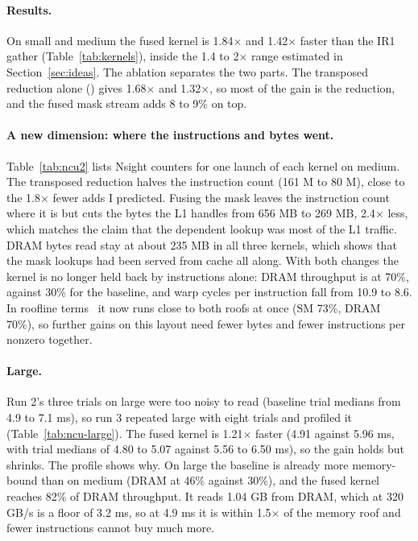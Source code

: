 \paragraph{Results.} On small and medium the fused kernel is 1.84$\times$ and 1.42$\times$ faster than
the IR1 gather (Table~\ref{tab:kernels}), inside the 1.4 to 2$\times$ range estimated in
Section~\ref{sec:ideas}. The ablation separates the two parts. The transposed reduction alone
() gives 1.68$\times$ and 1.32$\times$, so most of the gain is the reduction, and the
fused mask stream adds 8 to 9\% on top.

\paragraph{A new dimension: where the instructions and bytes went.} Table~\ref{tab:ncu2} lists Nsight
counters for one launch of each kernel on medium. The transposed reduction halves the instruction count
(161 M to 80 M), close to the 1.8$\times$ fewer adds I predicted. Fusing the mask leaves the instruction
count where it is but cuts the bytes the L1 handles from 656 MB to 269 MB, 2.4$\times$ less, which
matches the claim that the dependent lookup was most of the L1 traffic. DRAM bytes read stay at about
235 MB in all three kernels, which shows that the mask lookups had been served from cache all along.
With both changes the kernel is no longer held back by instructions alone: DRAM throughput is at 70\%, against 30\%
for the baseline, and warp cycles per instruction fall from 10.9 to 8.6. In roofline terms~\cite{williams2009} it now runs close to both roofs at once (SM 73\%, DRAM 70\%),
so further gains on this layout need fewer bytes and fewer instructions per nonzero together.

\paragraph{Large.} Run 2's three trials on large were too noisy to read (baseline trial medians from 4.9
to 7.1 ms), so run 3 repeated large with eight trials and profiled it (Table~\ref{tab:ncu-large}). The
fused kernel is 1.21$\times$ faster (4.91 against 5.96 ms, with trial medians of 4.80 to 5.07 against 5.56
to 6.50 ms), so the gain holds but shrinks. The profile shows why. On large the baseline is already more
memory-bound than on medium (DRAM at 46\% against 30\%), and the fused kernel reaches 82\% of DRAM
throughput. It reads 1.04 GB from DRAM, which at 320 GB/s is a floor of 3.2 ms, so at 4.9 ms it is within
1.5$\times$ of the memory roof and fewer instructions cannot buy much more.

